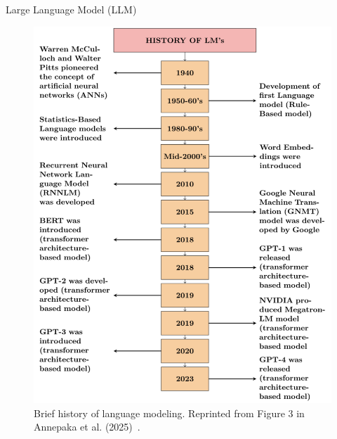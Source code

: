 \documentclass[12pt]{beamer}
\begin{document}
\begin{frame}[allowframebreaks]{Large Language Model (LLM)}
    \begin{figure}
        \centering
        \includegraphics[height=0.64\textheight]{figures/lm_history.png}
        \caption{Brief history of language modeling. Reprinted from Figure 3 in Annepaka et al. (2025)~\cite{Annepaka2025}.}
        \label{fig:Fig. 4}
    \end{figure}
\end{frame}
\end{document}
